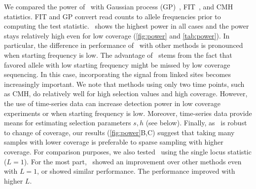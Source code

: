 We compared the power of \comale\ with Gaussian process
(GP)~\cite{Terhorst2015Multi}, FIT~\cite{feder2014Identifying}, and
CMH~\cite{agresti2011categorical} statistics.  FIT and GP convert read
counts to allele frequencies prior to computing the test statistic.
\comale\ shows the highest power in all cases and the power stays
relatively high even for low coverage (\ref{fig:power} and
\ref{tab:power}). In particular, the difference in performance of
\comale\ with other methods is pronounced when starting frequency is
low.  The advantage of \comale\ stems from the fact that favored
allele with low starting frequency might be missed by low coverage
sequencing. In this case, incorporating the signal from linked sites
becomes increasingly important. We note that methods using only two
time points, such as CMH, do relatively well for high selection values
and high coverage. However, the use of time-series data can increase
detection power in low coverage experiments or when starting frequency
is low. Moreover, time-series data provide means for estimating
selection parameters $s,h$ (see below). Finally, as \comale\ is robust
to change of coverage, our results (\ref{fig:power}B,C) suggest that
taking many samples with lower coverage is preferable to sparse
sampling with higher coverage. For comparison purposes, we also tested
\comale\ using the single locus statistic ($L=1$). For the most part,
\comale\ showed an improvement over other methods even with $L=1$, or
showed similar performance. The performance improved with higher $L$.


